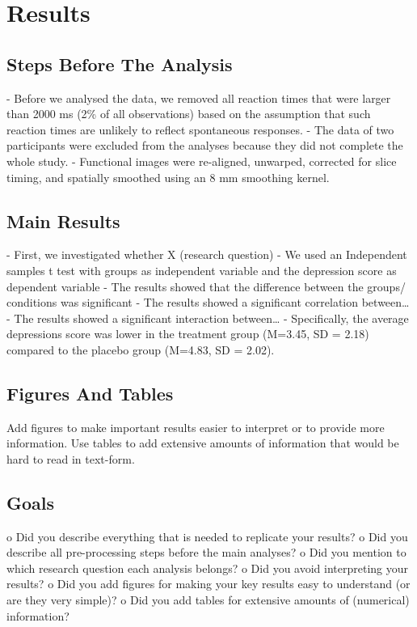 \chapter{Results}

\section{Steps Before The Analysis}
\label{steps-before-analysis}

- Before we analysed the data, we removed all reaction times that were larger than 2000 ms
(2\% of all observations) based on the assumption that such reaction times are unlikely to
reflect spontaneous responses.
- The data of two participants were excluded from the analyses because they did not complete
the whole study.
- Functional images were re-aligned, unwarped, corrected for slice timing, and spatially
smoothed using an 8 mm smoothing kernel.

\section{Main Results}
\label{main-results}

- First, we investigated whether X (research question)
- We used an Independent samples t test with groups as independent variable and the
depression score as dependent variable
- The results showed that the difference between the groups/ conditions was significant
- The results showed a significant correlation between…
- The results showed a significant interaction between…
- Specifically, the average depressions score was lower in the treatment group (M=3.45, SD = 2.18) compared to the placebo group (M=4.83, SD = 2.02).

\section{Figures And Tables}
\label{figures-and-tables}

Add figures to make important results easier to interpret or to provide more information. Use tables to add extensive amounts of information that would be hard to read in text-form.

\section{Goals}
\label{chapter5-goals}

o Did you describe everything that is needed to replicate your results?
o Did you describe all pre-processing steps before the main analyses?
o Did you mention to which research question each analysis belongs?
o Did you avoid interpreting your results?
o Did you add figures for making your key results easy to understand (or are they very simple)?
o Did you add tables for extensive amounts of (numerical) information?


